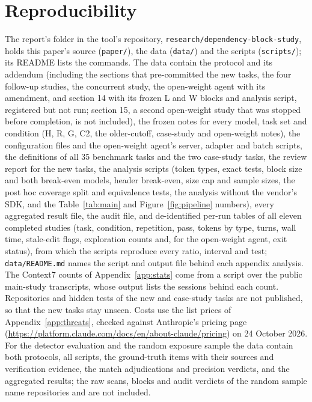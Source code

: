 \documentclass[11pt]{article}
\newcommand{\code}[1]{\texttt{#1}}
\begin{document}
\section{Reproducibility}
\label{app:repro}

The report's folder in the tool's repository, \code{research/dependency-block-study}, holds this paper's source (\code{paper/}), the data (\code{data/}) and the scripts (\code{scripts/}); its README lists the commands. The data contain the protocol and its addendum (including the sections that pre-committed the new tasks, the four follow-up studies, the concurrent study, the open-weight agent with its amendment, and section 14 with its frozen L and W blocks and analysis script, registered but not run; section 15, a second open-weight study that was stopped before completion, is not included), the frozen notes for every model, task set and condition (H, R, G, C2, the older-cutoff, case-study and open-weight notes), the configuration files and the open-weight agent's server, adapter and batch scripts, the definitions of all 35 benchmark tasks and the two case-study tasks, the review report for the new tasks, the analysis scripts (token types, exact tests, block size and both break-even models, header break-even, size cap and sample sizes, the post hoc coverage split and equivalence tests, the analysis without the vendor's SDK, and the Table~\ref{tab:main} and Figure~\ref{fig:pipeline} numbers), every aggregated result file, the audit file, and de-identified per-run tables of all eleven completed studies (task, condition, repetition, pass, tokens by type, turns, wall time, stale-edit flags, exploration counts and, for the open-weight agent, exit status), from which the scripts reproduce every ratio, interval and test; \code{data/README.md} names the script and output file behind each appendix analysis. The Context7 counts of Appendix~\ref{app:stats} come from a script over the public main-study transcripts, whose output lists the sessions behind each count. Repositories and hidden tests of the new and case-study tasks are not published, so that the new tasks stay unseen.
Costs use the list prices of Appendix~\ref{app:threats}, checked against Anthropic's pricing page (\url{https://platform.claude.com/docs/en/about-claude/pricing}) on 24 October 2026.
For the detector evaluation and the random exposure sample the data contain both protocols, all scripts, the ground-truth items with their sources and verification evidence, the match adjudications and precision verdicts, and the aggregated results; the raw scans, blocks and audit verdicts of the random sample name repositories and are not included.
\end{document}
